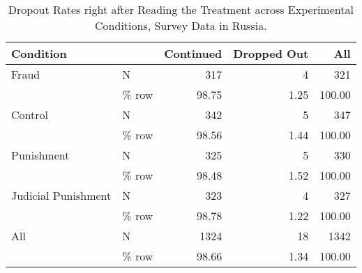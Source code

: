 \begin{table}

\caption{Dropout Rates right after Reading the Treatment across Experimental Conditions,
Survey Data in Russia.}
\centering
\begin{tabular}[t]{llrrr}
\toprule
Condition &   & Continued & Dropped Out & All\\
\midrule
Fraud & N & 317 & 4 & 321\\
 & \% row & \num{98.75} & \num{1.25} & \num{100.00}\\
Control & N & 342 & 5 & 347\\
 & \% row & \num{98.56} & \num{1.44} & \num{100.00}\\
Punishment & N & 325 & 5 & 330\\
 & \% row & \num{98.48} & \num{1.52} & \num{100.00}\\
Judicial Punishment & N & 323 & 4 & 327\\
 & \% row & \num{98.78} & \num{1.22} & \num{100.00}\\
All & N & 1324 & 18 & 1342\\
 & \% row & \num{98.66} & \num{1.34} & \num{100.00}\\
\bottomrule
\end{tabular}
\end{table}

